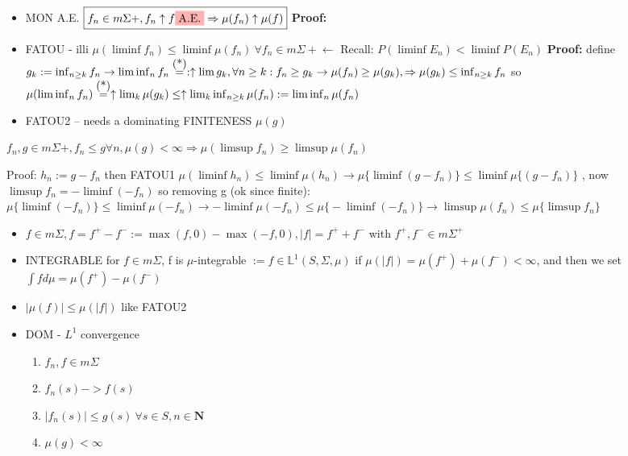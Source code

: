 \documentclass[10pt,landscape,a4paper]{article}
\newcommand\myeq[1]{\stackrel{{\normalfont\mbox{#1}}}{ = }}
\begin{document}
\begin{multicols*}{3}
\begin{spacing}{0.5}
\begin{itemize}
\item \colorbox{red!10}{MON A.E.} $\boxed{ {f_n} \in m\Sigma+, f_n \uparrow f \colorbox{red!30}{A.E.} \Rightarrow \mu(f_n) \uparrow \mu(f) }$ \textbf{Proof:} 

\item \colorbox{red!10}{FATOU - illi} $\boxed{   \mu (\liminf f_n) \le \liminf \mu(f_n) \ \forall f_n \in m\Sigma+ } \longleftarrow $ Recall: $\boxed{P( \liminf E_n) < \liminf P(E_n) }$ \textbf{Proof:} define $ g_k := \inf_{n \ge k} f_n \rightarrow \liminf_n f_n \myeq{(*)}: \uparrow \lim g_k, \forall n \ge k : f_n \ge g_k \rightarrow \mu(f_n) \ge \mu(g_k), \Rightarrow \mu(g_k)  \le \inf_{n \ge k} f_n $ so $ \mu (\liminf_n f_n) \myeq{(*)} \uparrow \lim_k \mu(g_k) \le \uparrow \lim_k \inf_{n \ge k} \mu(f_n) := \liminf_n \mu(f_n)$

\item  \colorbox{red!10}{FATOU2 -- needs a dominating FINITENESS $\mu(g)$} 
\end{itemize}
\begin{mdframed}

$f_n,g \in m\Sigma+, f_n \le g \forall n, \mu(g) < \infty \Rightarrow \mu(\limsup f_n) \ge \limsup \mu(f_n)$
\end{mdframed}

Proof: $h_n := g-f_n$ then FATOU1 $\mu(\liminf h_n) \le \liminf \mu(h_n) \rightarrow \mu \big \{ \liminf (g-f_n) \big \} \le \liminf \mu \big \{ (g-f_n) \big \} $ , now \textbf{$\limsup f_n = -\liminf (-f_n)$} so removing g (ok since finite): $\mu \big \{ \liminf (-f_n) \big \} \le \liminf \mu  (-f_n) \rightarrow  -\liminf \mu  (-f_n) \le \mu \big \{ -\liminf (-f_n) \big \} \rightarrow \limsup \mu (f_n) \le \mu \big \{ \limsup f_n \big \}$

\begin{itemize}

\item $f \in m\Sigma, f = f^+ - f^- := \max (f,0) - \max (-f,0), |f|=f^+ + f^-$ with $f^+,f^- \in m\Sigma^+$

\item  \colorbox{green!10}{INTEGRABLE} for $f \in m\Sigma$, f is $\mu$-integrable $:= f \in \mathbb{L}^1 (S,\Sigma,\mu) $ if $\mu(|f|) = \mu(f^+) + \mu(f^-) < \infty$, and then we set $\int f d\mu = \mu(f^+) - \mu(f^-)$

\item  $ |\mu(f)| \le \mu(|f|) $ like FATOU2

\item  \colorbox{red!10}{DOM - $L^1$ convergence}
\begin{enumerate}
\item $ f_n,f \in m\Sigma$
\item $f_n(s) ->  f(s)$
\item $|f_n(s)| \le g(s) \ \forall s \in S, n \in \mathbf{N}$
\item $\mu(g) < \infty$


\end{enumerate}
\end{itemize}
\end{spacing}
\end{multicols*}
\end{document}
